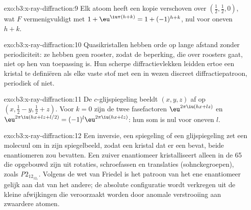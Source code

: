 \begin{solution}{exo:b3:x-ray-diffraction:9}
Elk atoom heeft een kopie verschoven over $(\frac12,\frac12,0)$, wat $F$ vermenigvuldigt met $1 +
\eu^{\iu\pi(h+k)} = 1 + (-1)^{h+k}$, nul voor oneven $h + k$.
\end{solution}

\begin{solution}{exo:b3:x-ray-diffraction:10}
Quasikristallen hebben orde op lange afstand zonder periodiciteit: ze
hebben geen rooster, zodat de beperking, die over roosters gaat, niet op
hen van toepassing is. Hun scherpe diffractievlekken leidden ertoe een
kristal te definiëren als elke vaste stof met een in wezen discreet
diffractiepatroon, periodiek of niet.
\end{solution}

\begin{solution}{exo:b3:x-ray-diffraction:11}
De $c$-glijspiegeling beeldt $(x, y, z)$ af op $(x, \frac12 - y, \frac12 + z)$. Voor $k = 0$ zijn de twee
fasefactoren $\eu^{2\pi\iu(hx + lz)}$ en $\eu^{2\pi\iu(hx + lz + l/2)} = (-1)^l
\eu^{2\pi\iu(hx+lz)}$: hun som is nul voor oneven $l$.
\end{solution}

\begin{solution}{exo:b3:x-ray-diffraction:12}
Een inversie, een spiegeling of een glijspiegeling zet een molecuul om in
zijn spiegelbeeld, zodat een kristal dat er een bevat, beide enantiomeren
zou bevatten. Een zuiver enantiomeer kristalliseert alleen in de 65
 die opgebouwd zijn uit rotaties, schroefassen en translaties
(sohnckegroepen), zoals \textit{P}$2_12_12_1$. Volgens de wet van Friedel is
het patroon van het ene enantiomeer gelijk aan dat van het andere; de
absolute configuratie wordt verkregen uit de kleine afwijkingen die
veroorzaakt worden door anomale verstrooiing aan zwaardere atomen.
\end{solution}

